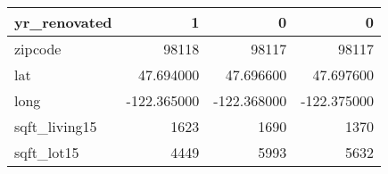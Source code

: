 \begin{table}[H]
\begin{tabular}{|l|r|r|r|}
\hline yr\_renovated & \cellcolor[rgb]{0.9, 0.54, 0.52} 1 & 0 & 0 \\
\hline zipcode & \cellcolor[rgb]{0.9, 0.54, 0.52} 98118 & 98117 & 98117 \\
\hline lat & \cellcolor[rgb]{0.9, 0.54, 0.52} 47.694000 & 47.696600 & 47.697600 \\
\hline long & \cellcolor[rgb]{0.9, 0.54, 0.52} -122.365000 & \cellcolor[rgb]{0.9, 0.54, 0.52} -122.368000 & \cellcolor[rgb]{0.9, 0.54, 0.52} -122.375000 \\
\hline sqft\_living15 & \cellcolor[rgb]{0.9, 0.54, 0.52} 1623 & 1690 & 1370 \\
\hline sqft\_lot15 & \cellcolor[rgb]{0.9, 0.54, 0.52} 4449 & 5993 & 5632 \\
\hline
\end{tabular}
\end{table}
